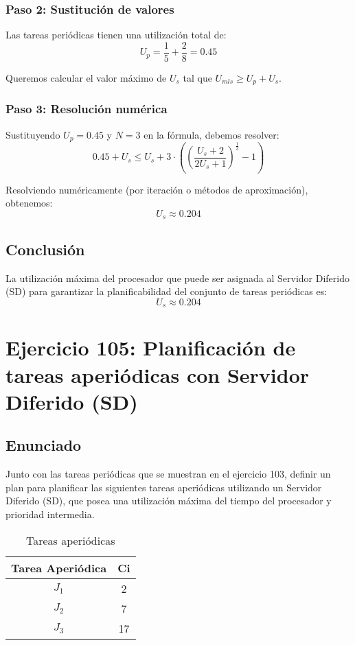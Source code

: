 \documentclass[a4paper,12pt]{article}
\begin{document}
\subsubsection{Paso 2: Sustitución de valores}
Las tareas periódicas tienen una utilización total de:
\[
U_p = \frac{1}{5} + \frac{2}{8} = 0.45
\]

Queremos calcular el valor máximo de \(U_s\) tal que \(U_{mls} \geq U_p + U_s\).

\subsubsection{Paso 3: Resolución numérica}
Sustituyendo \(U_p = 0.45\) y \(N = 3\) en la fórmula, debemos resolver:
\[
0.45 + U_s \leq U_s + 3 \cdot \left( \left( \frac{U_s + 2}{2U_s + 1} \right)^{\frac{1}{3}} - 1 \right)
\]

Resolviendo numéricamente (por iteración o métodos de aproximación), obtenemos:
\[
U_s \approx 0.204
\]

\subsection{Conclusión}
La utilización máxima del procesador que puede ser asignada al Servidor Diferido (SD) para garantizar la planificabilidad del conjunto de tareas periódicas es:
\[
\boxed{U_s \approx 0.204}
\]

\section{Ejercicio 105: Planificación de tareas aperiódicas con Servidor Diferido (SD)}
\subsection{Enunciado}
Junto con las tareas periódicas que se muestran en el ejercicio 103, definir un plan para planificar las siguientes tareas aperiódicas utilizando un Servidor Diferido (SD), que posea una utilización máxima del tiempo del procesador y prioridad intermedia.

\begin{table}[H]
\centering
\begin{tabular}{|c|c|}
\hline
\textbf{Tarea Aperiódica} & \textbf{Ci} \\ \hline
$J_1$ & 2 \\ \hline
$J_2$ & 7 \\ \hline
$J_3$ & 17 \\ \hline
\end{tabular}
\caption{Tareas aperiódicas}
\end{table}
\end{document}
